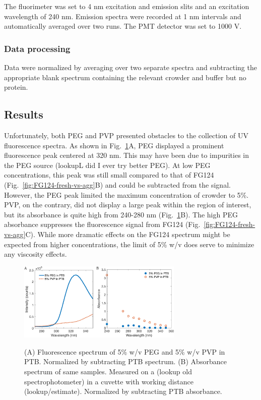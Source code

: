 The fluorimeter was set to 4 nm excitation and emission slits and an excitation wavelength of 240 nm.  Emission spectra were recorded at 1 nm intervals and automatically averaged over two runs.  The PMT detector was set to 1000 V.

\subsubsection{Data processing}
Data were normalized by averaging over two separate spectra and subtracting the appropriate blank spectrum containing the relevant crowder and buffer but no protein.

\subsection{Results}
Unfortunately, both PEG and PVP presented obstacles to the collection of UV fluorescence spectra. As shown in Fig.~\ref{fig:crowder-prop}A, PEG displayed a prominent fluorescence peak centered at 320 nm.  This may have been due to impurities in the PEG source (lookupL did I ever try better PEG).  At low PEG concentrations, this peak was still small compared to that of FG124 (Fig.~\ref{fig:FG124-fresh-vs-agg}B) and could be subtracted from the signal.  However, the PEG peak limited the maximum concentration of crowder to 5\%.  PVP, on the contrary, did not display a large peak within the region of interest, but its absorbance is quite high from 240-280 nm (Fig.~\ref{fig:crowder-prop}B).  The high PEG absorbance suppresses the fluorescence signal from FG124 (Fig.~\ref{fig:FG124-fresh-vs-agg}C).  While more dramatic effects on the FG124 spectrum might be expected from higher concentrations, the limit of 5\% w/v does serve to minimize any viscosity effects.

\begin{figure}
\caption[Fluorescence and absorbance of crowders.]{(A) Fluorescence spectrum of 5\% w/v PEG and 5\% w/v PVP in PTB.  Normalized by subtracting PTB spectrum.  (B) Absorbance spectrum of same samples.  Measured on a (lookup old spectrophotometer) in a cuvette with working distance (lookup/estimate).  Normalized by subtracting PTB absorbance.\\}
\centering
\includegraphics[width=0.7\textwidth]{figs/ch05/crowder-properties}
\label{fig:crowder-prop}
\end{figure}

